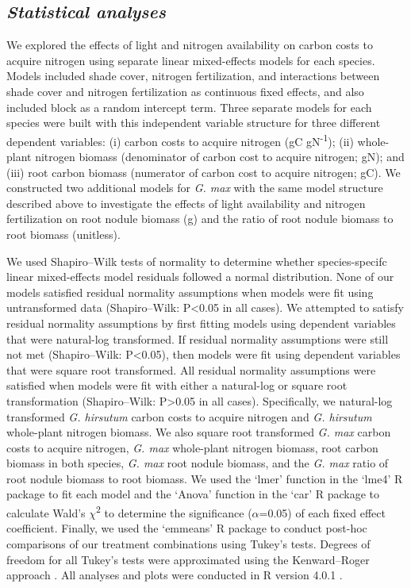 \subsection{\textit{Statistical analyses}}
We explored the effects of light and nitrogen availability on carbon costs to acquire nitrogen using separate linear mixed-effects models for each species. Models included shade cover, nitrogen fertilization, and interactions between shade cover and nitrogen fertilization as continuous fixed effects, and also included block as a random intercept term. Three separate models for each species were built with this independent variable structure for three different dependent variables: (i) carbon costs to acquire nitrogen (gC gN\textsuperscript{-1}); (ii) whole-plant nitrogen biomass (denominator of carbon cost to acquire nitrogen; gN); and (iii) root carbon biomass (numerator of carbon cost to acquire nitrogen; gC). We constructed two additional models for \textit{G. max} with the same model structure described above to investigate the effects of light availability and nitrogen fertilization on root nodule biomass (g) and the ratio of root nodule biomass to root biomass (unitless).

We used Shapiro–Wilk tests of normality to determine whether species-specifc linear mixed-effects model residuals followed a normal distribution. None of our models satisfied residual normality assumptions when models were fit using untransformed data (Shapiro–Wilk: P<0.05 in all cases). We attempted to satisfy residual normality assumptions by first fitting models using dependent variables that were natural-log transformed. If residual normality assumptions were still not met (Shapiro–Wilk: P<0.05), then models were fit using dependent variables that were square root transformed. All residual normality assumptions were satisfied when models were fit with either a natural-log or square root transformation (Shapiro–Wilk: P>0.05 in all cases). Specifically, we natural-log transformed \textit{G. hirsutum} carbon costs to acquire nitrogen and \textit{G. hirsutum} whole-plant nitrogen biomass. We also square root transformed \textit{G. max} carbon costs to acquire nitrogen, \textit{G. max} whole-plant nitrogen biomass, root carbon biomass in both species, \textit{G. max} root nodule biomass, and the \textit{G. max} ratio of root nodule biomass to root biomass. We used the ‘lmer’ function in the ‘lme4’ R package  to fit each model and the ‘Anova’ function in the ‘car’ R package  to calculate Wald’s $\chi$\textsuperscript{2} to determine the significance ($\alpha$=0.05) of each fixed effect coefficient. Finally, we used the ‘emmeans’ R package  to conduct post-hoc comparisons of our treatment combinations using Tukey’s tests. Degrees of freedom for all Tukey’s tests were approximated using the Kenward–Roger approach . All analyses and plots were conducted in R version 4.0.1 .

